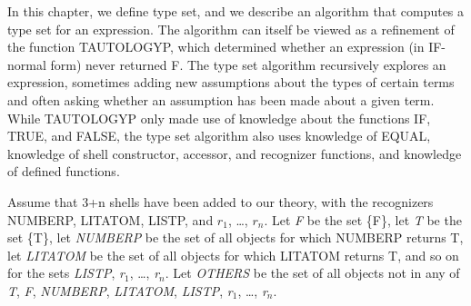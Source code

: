 \documentclass[10pt]{book}
\begin{document}
In this chapter, we define  type set, and we
describe an algorithm that computes a type set
for an expression.  The algorithm can itself be viewed as a 
refinement of the function TAUTOLOGYP, which determined whether
an expression (in IF-normal form) never returned
F.  The type set algorithm recursively explores
an expression, sometimes adding new assumptions
about the types of certain terms and often asking
whether an assumption has been made about a given term.
While TAUTOLOGYP only made use of knowledge about
the functions IF, TRUE, and FALSE, the type set
algorithm also uses knowledge of EQUAL,  knowledge of
shell constructor, accessor, and recognizer functions, and
knowledge of defined functions.

Assume that 3+n shells have been added to our
theory, with the recognizers NUMBERP, LITATOM,
LISTP, and $r_{1}$, \ldots{}, $r_{n}$.
Let \emph{F} be the set \{F\}, let \emph{T} be the
set \{T\}, let \emph{NUMBERP} be the set of all
objects for which NUMBERP returns T, let
\emph{LITATOM} be the set of all objects for which
LITATOM returns T, and so on for the sets \emph{LISTP},
\emph{r}$_{1}$, \ldots{}, \emph{r}$_{n}$.  Let \emph{OTHERS} be the
set of all objects not in any of \emph{T}, \emph{F}, \emph{NUMBERP},
\emph{LITATOM}, \emph{LISTP}, \emph{r}$_{1}$, \ldots{}, \emph{r}$_{n}$.
\end{document}
